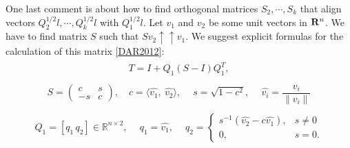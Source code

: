 \documentclass[letterpaper,10pt,english]{sphinxmanual}
\begin{document}
One last comment is about how to find orthogonal matrices
$S_2,\cdots,S_k$ that align vectors
$Q_2^{1/2}l, \cdots, Q_k^{1/2}l$ with $Q_1^{1/2}l$. Let
$v_1$ and $v_2$ be some unit vectors in ${\bf R}^n$.
We have to find matrix $S$ such that
$Sv_2\uparrow\uparrow v_1$.
We suggest explicit formulas for the
calculation of this matrix {\hyperref[main_source:dar2012]{{[}DAR2012{]}}}:
\label{main_source:equation-valign1}\begin{gather}
\begin{split}T = I + Q_1(S - I)Q_1^T,\end{split}\label{main_source-valign1}
\end{gather}\label{main_source:equation-valign2}\begin{gather}
\begin{split}S = \begin{pmatrix}
     c & s\\
     -s & c
    \end{pmatrix},\quad c = \langle\hat{v_1},\ \hat{v_2}\rangle,\ \quad s = \sqrt{1 - c^2},\ \quad \hat{v_i} = \dfrac{v_i}{\|v_i\|}\end{split}\label{main_source-valign2}
\end{gather}\label{main_source:equation-valign3}\begin{gather}
\begin{split}Q_1 = [q_1 \, q_2]\in \mathbb{R}^{n\times2},\ \quad q_1 = \hat{v_1},\ \quad q_2 = \begin{cases}
s^{-1}(\hat{v_2} - c\hat{v_1}),& s\ne 0\\
0,& s = 0.
\end{cases}\end{split}\label{main_source-valign3}
\end{gather}
\end{document}
